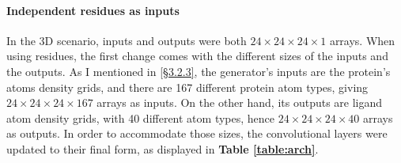 \documentclass{article}
\begin{document}
\paragraph{Independent residues as inputs}
In the 3D scenario, inputs and outputs were both $24 \times 24 \times 24 \times 1$ arrays. When using residues, the first change comes with the different sizes of the inputs and the outputs. As I mentioned in \hyperref[sec:input_output_mask]{[\S3.2.3]}, the generator's inputs are the protein's atoms density grids, and there are 167 different protein atom types, giving $24 \times 24 \times 24 \times 167$ arrays as inputs. On the other hand, its outputs are ligand atom density grids, with 40 different atom types, hence $24 \times 24 \times 24 \times 40$ arrays as outputs. In order to accommodate those sizes, the convolutional layers were updated to their final form, as displayed in \textbf{Table \ref{table:arch}}.
\begin{table}[H]
\centering
\caption{Ligand generator architecture.}
\label{table:arch}
\end{table}
\end{document}
